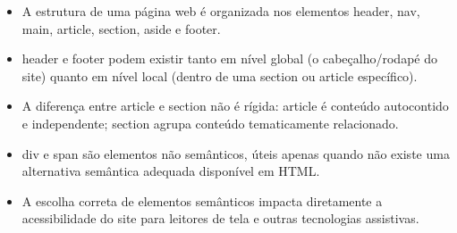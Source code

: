 \begin{itemize}
  \item A estrutura de uma página web é organizada nos elementos header, nav, main, article, section, aside e footer.
\end{itemize}

\begin{itemize}
  \item header e footer podem existir tanto em nível global (o cabeçalho/rodapé do site) quanto em nível local (dentro de uma section ou article específico).
\end{itemize}

\begin{itemize}
  \item A diferença entre article e section não é rígida: article é conteúdo autocontido e independente; section agrupa conteúdo tematicamente relacionado.
\end{itemize}

\begin{itemize}
  \item div e span são elementos não semânticos, úteis apenas quando não existe uma alternativa semântica adequada disponível em HTML.
\end{itemize}

\begin{itemize}
  \item A escolha correta de elementos semânticos impacta diretamente a acessibilidade do site para leitores de tela e outras tecnologias assistivas.
\end{itemize}
